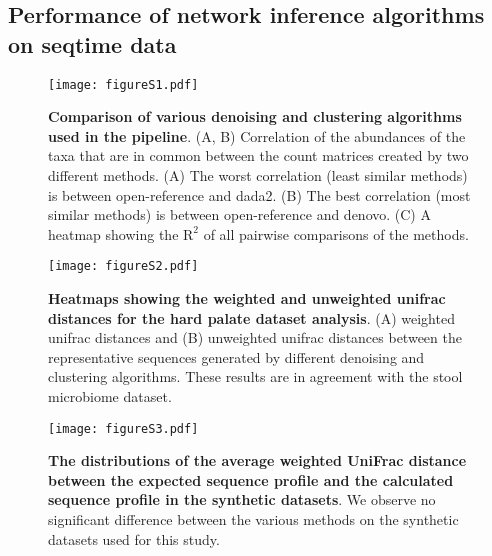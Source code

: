   \subsection*{Performance of network inference algorithms on seqtime data}

  \begin{figure}[h]
  \centering
  \texttt{[image: figureS1.pdf]}
  \caption{
    \textbf{Comparison of various denoising and clustering algorithms used in the pipeline}.
    (A, B) Correlation of the abundances of the taxa that are in common between the count matrices created by two different methods.
    (A) The worst correlation (least similar methods) is between open-reference and dada2.
    (B) The best correlation (most similar methods) is between open-reference and denovo.
    (C) A heatmap showing the $\mathrm{R}^2$ of all pairwise comparisons of the methods.
  }
  \label{fig:figureS1}
\end{figure}

  \begin{figure}[h]
    \centering
    \texttt{[image: figureS2.pdf]}
    \caption{
      \textbf{Heatmaps showing the weighted and unweighted unifrac distances for the hard palate dataset analysis}.
      (A) weighted unifrac distances and (B) unweighted unifrac distances between the representative sequences generated by different denoising and clustering algorithms.
      These results are in agreement with the stool microbiome dataset.
    }
    \label{fig:figureS2}
  \end{figure}

  \begin{figure}[h]
    \centering
    \texttt{[image: figureS3.pdf]}
    \caption{
      \textbf{The distributions of the average weighted UniFrac distance between the expected sequence profile and the calculated sequence profile in the synthetic datasets}.
      We observe no significant difference between the various methods on the synthetic datasets used for this study.
    }
    \label{fig:figureS3}
  \end{figure}


